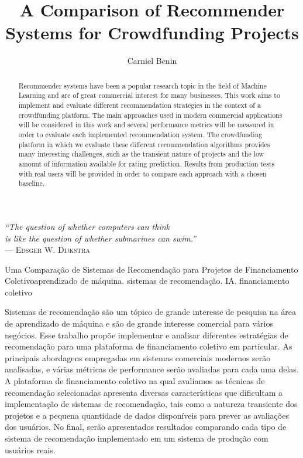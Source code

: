 \documentclass[cic,tc,english]{iiufrgs}
\title{A Comparison of Recommender Systems for Crowdfunding Projects}
\author{Carniel Benin}{Adriano}
\begin{document}
\maketitle

\clearpage
\begin{flushright}
    \mbox{}\vfill
    {\sffamily\itshape
      ``The question of whether computers can think\\
      is like the question of whether submarines can swim.''\\}
    --- \textsc{Edsger W. Dijkstra}
\end{flushright}

\begin{abstract}
    Recommender systems have been a popular research topic in the field of Machine Learning and are of great commercial interest for many businesses. This work aims to implement and evaluate different recommendation strategies in the context of a crowdfunding platform. The main approaches used in modern commercial applications will be considered in this work and several performance metrics will be measured in order to evaluate each implemented recommendation system. The crowdfunding platform in which we evaluate these different recommendation algorithms provides many interesting challenges, such as the transient nature of projects and the low amount of information available for rating prediction. Results from production tests with real users will be provided in order to compare each approach with a chosen baseline.
\end{abstract}
\begin{englishabstract}{Uma Comparação de Sistemas de Recomendação para Projetos de Financiamento Coletivo}{aprendizado de máquina. sistemas de recomendação. IA. financiamento coletivo}

Sistemas de recomendação são um tópico de grande interesse de pesquisa na área de aprendizado de máquina e são de grande interesse comercial para vários negócios. Esse trabalho propõe implementar e analisar diferentes estratégias de recomendação para uma plataforma de financiamento coletivo em particular. As principais abordagens empregadas em sistemas comerciais modernos serão analisadas, e várias métricas de performance serão avaliadas para cada uma delas. A plataforma de financiamento coletivo na qual avaliamos as técnicas de recomendação selecionadas apresenta diversas características que dificultam a implementação de sistemas de recomendação, tais como a natureza transiente dos projetos e a pequena quantidade de dados disponíveis para prever as avaliações dos usuários. No final, serão apresentados resultados comparando cada tipo de sistema de recomendação implementado em um sistema de produção com usuários reais. 
\end{englishabstract}
\end{document}
